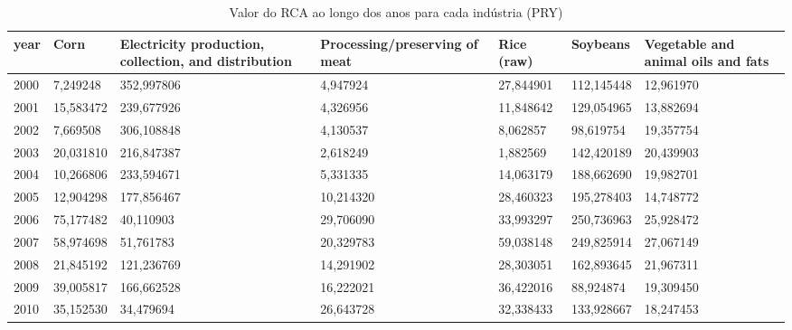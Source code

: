 \begin{table}
\centering
\caption{Valor do RCA ao longo dos anos para cada indústria (PRY)}
\begin{tabular}{p{1cm}p{2cm}p{2cm}p{2cm}p{2cm}p{2cm}p{2cm}}
\toprule
 year &      Corn &  Electricity production, collection, and distribution &  Processing/preserving of meat &  Rice (raw) &   Soybeans &  Vegetable and animal oils and fats \\
\midrule
 2000 &  7,249248 &                                         352,997806 &                       4,947924 &   27,844901 & 112,145448 &                           12,961970 \\
 2001 & 15,583472 &                                         239,677926 &                       4,326956 &   11,848642 & 129,054965 &                           13,882694 \\
 2002 &  7,669508 &                                         306,108848 &                       4,130537 &    8,062857 &  98,619754 &                           19,357754 \\
 2003 & 20,031810 &                                         216,847387 &                       2,618249 &    1,882569 & 142,420189 &                           20,439903 \\
 2004 & 10,266806 &                                         233,594671 &                       5,331335 &   14,063179 & 188,662690 &                           19,982701 \\
 2005 & 12,904298 &                                         177,856467 &                      10,214320 &   28,460323 & 195,278403 &                           14,748772 \\
 2006 & 75,177482 &                                          40,110903 &                      29,706090 &   33,993297 & 250,736963 &                           25,928472 \\
 2007 & 58,974698 &                                          51,761783 &                      20,329783 &   59,038148 & 249,825914 &                           27,067149 \\
 2008 & 21,845192 &                                         121,236769 &                      14,291902 &   28,303051 & 162,893645 &                           21,967311 \\
 2009 & 39,005817 &                                         166,662528 &                      16,222021 &   36,422016 &  88,924874 &                           19,309450 \\
 2010 & 35,152530 &                                          34,479694 &                      26,643728 &   32,338433 & 133,928667 &                           18,247453 \\

\end{tabular}
\end{table}
